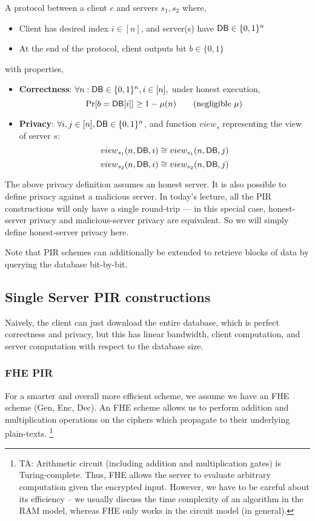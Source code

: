 \begin{definition}
A protocol between a client $c$ and servers $s_{1},s_{2}$ where,
\begin{itemize}
	\item Client has desired index $i \in [n]$, and server(s) have ${\sf DB} \in \{0,1\}^n$
	\item At the end of the protocol, client outputs bit $b \in \{0,1\}$
\end{itemize}
with properties,
\begin{itemize}

	\item \textbf{Correctness}: $\forall n: {\sf DB} \in \{0,1\}^n, i \in [n],$ under honest execution, 
	\[\Pr[b = {\sf DB}[i]] \geq 1 - \mu(n) \tag{negligible $\mu$}\]
	
	\item \textbf{Privacy}: $\forall i,j \in [n], {\sf DB}  \in \{0,1\}^n$, and function $view_{s}$ representing the view of server $s$:
	\[view_{s_{1}}(n,{\sf DB},i) \cong view_{s_{1}}(n,{\sf DB},j)\]
	\[view_{s_{2}}(n,{\sf DB},i) \cong view_{s_{2}}(n,{\sf DB},j)\]
\end{itemize}
\end{definition}

\begin{remark}
The above privacy definition assumes an honest server.
It is also possible to define privacy against a malicious server.
In today's lecture, all the PIR constructions
will only have a single round-trip --- 
in this special case, honest-server privacy
and malicious-server
privacy are equivalent. So we will simply define honest-server privacy here.
\end{remark}

Note that PIR schemes can additionally be extended to retrieve blocks of data by querying the database bit-by-bit.
\subsection{Single Server PIR constructions}
Naively, the client can just download the entire database, which is perfect correctness and privacy, but this has linear bandwidth, client computation, and server computation with respect to the database size.

\subsubsection{FHE PIR}
For a smarter and overall more efficient scheme, we assume we have an FHE scheme (Gen, Enc, Dec). An FHE scheme allows us to perform addition and multiplication operations on the ciphers which propagate to their underlying plain-texts.
\footnote{TA:
Arithmetic circuit (including addition and multiplication gates) is Turing-complete. Thus, FHE allows the server to evaluate arbitrary computation given the encrypted input. However, we have to be careful about its efficiency -- we usually discuss the time complexity of an algorithm in the RAM model, whereas FHE only works in the circuit model (in general).}

